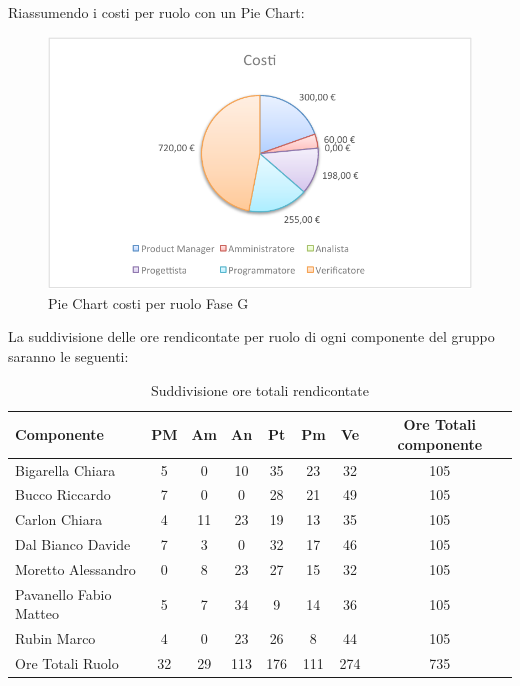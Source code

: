 				Riassumendo i costi per ruolo con un Pie Chart:
				\begin{figure}[H]\centering
					\includegraphics[width=\textwidth]{PianoDiProgetto/Pics/ChartTotCostiFaseG.pdf}
					\caption{Pie Chart costi per ruolo Fase G}
				\end{figure}
			La suddivisione delle ore rendicontate per ruolo di ogni componente del gruppo \groupname{} saranno le seguenti:
			\begin{table}[H]
				\begin{center}
					\begin{tabular}{| l | c | c | c | c | c | c | c |}
						\hline
						Componente 					& PM		& Am 	& An 		& Pt 		& Pm 		& Ve 		& Ore Totali componente \\ \hline
						
						Bigarella Chiara 			& 5 		& 0		& 10 		& 35 		& 23 		& 32 		& 105 \\
						Bucco Riccardo 				& 7 		& 0		& 0			& 28 		& 21		& 49 		& 105 \\
						Carlon Chiara	 			& 4 		& 11 	& 23 		& 19 		& 13 		& 35 		& 105 \\
						Dal Bianco Davide 			& 7 		& 3		& 0			& 32 		& 17 		& 46 		& 105 \\
						Moretto Alessandro 			& 0			& 8 	& 23 		& 27 		& 15 		& 32 		& 105 \\
						Pavanello Fabio Matteo	 	& 5 		& 7		& 34 		& 9 		& 14 		& 36 		& 105 \\
						Rubin Marco					& 4 		& 0 	& 23 		& 26 		& 8 		& 44		& 105 \\ \hline \hline
						
						Ore Totali Ruolo 			& 32 		& 29 	& 113 		& 176 		& 111 		& 274 		& 735\\ \hline
					\end{tabular}
				\end{center}
				\caption{Suddivisione ore totali rendicontate}
			\end{table}
